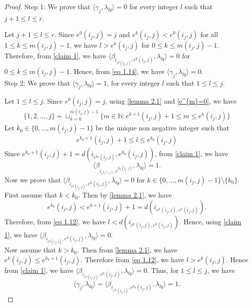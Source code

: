 \documentclass[12pt,reqno]{amsart}
\numberwithin{equation}{section}
\theoremstyle{definition}
\begin{document}
\begin{proof} Step 1: We prove that $\langle\gamma_{j},\lambda_{lq}\rangle=0$ for every integer $l$ such that $j+1\leq l\leq r$.
	
	Let $j+1\leq l\leq r$.
	Since $e^{0}(i_{j},j)=j$ and $e^{k}(i_{j},j)<e^{0}(i_{j},j)$ for all $1\leq k\leq m(i_{j},j)-1$, we have $l>e^{k}(i_{j},j)$ for $0\leq k\leq m(i_{j},j)-1$. Therefore, from \cref{claim 1}, we have  $\langle\beta_{i_{e^{k}(i_{j},j)},e^{k}(i_{j},j)},\lambda_{lq}\rangle=0$ for $0\leq k\leq m(i_{j},j)-1$. Hence, from \cref{eq 1.14}, we have $\langle\gamma_{j},\lambda_{lq}\rangle=0$.\\
	Step 2: We prove that $\langle\gamma_{j},\lambda_{lq}\rangle=1$, for every integer $l$ such that $1\leq l\leq j$.
	
	Let $1\leq l\leq j$. Since $e^{0}(i_{j},j)=j$, using \cref{lemma 2.1} and \cref{e^{m}=0}, we have 
	\begin{align*}
		\{1,2,\ldots,j\}=\sqcup_{k=0}^{m(i_{j},j)-1}\{m\in \mathbb{N}:e^{k+1}(i_{j},j)+1\leq m\leq e^{k}(i_{j},j)\}
	\end{align*}
	Let $k_{0}\in\{0,\ldots,m(i_{j},j)-1\}$ be the unique non negative integer such that \begin{align}\label{eq 1.12}
		e^{k_{0}+1}(i_{j},j)+1\leq l\leq e^{k_{0}}(i_{j},j)
	\end{align}
	Since 	$e^{k_{0}+1}(i_{j},j)+1=d(i_{e^{k_{0}}(i_{j},j)},e^{k_{0}}(i_{j},j))$, from \cref{claim 1}, we have $$\langle\beta_{i_{e^{k_{0}(i_{j},j)}},e^{k_{0}(i_{j},j)}},\lambda_{lq}\rangle=1.$$ Now we prove that $\langle\beta_{i_{e^{k}(i_{j},j)},e^{k}(i_{j},j)},\lambda_{lq}\rangle=0$ for $k\in\{0,\ldots,m(i_{j},j)-1\}\setminus\{k_{0}\}$.
	First assume that $k<k_{0}$. Then by \cref{lemma 2.1}, we have $$e^{k_{0}}(i_{j},j)<e^{k+1}(i_{j},j)+1=d(i_{e^{k}(i_{j},j),e^{k}(i_{j},j)}).$$ Therefore, from \cref{eq 1.12}, we have $l<d(i_{e^{k}(i_{j},j),e^{k}(i_{j},j)})$. Hence, using \cref{claim 1}, we have $\langle\beta_{i_{e^{k}(i_{j},j)},e^{k}(i_{j},j)},\lambda_{lq}\rangle=0$.\\
	Now assume that $k>k_{0}$. Then from \cref{lemma 2.1}, we have $e^{k}(i_{j},j)\leq e^{k_{0}+1}(i_{j},j)$. Therefore from \cref{eq 1.12}, we have $l>e^{k}(i_{j},j)$. Hence from \cref{claim 1}, we have $\langle\beta_{i_{e^{k}(i_{j},j)},e^{k}(i_{j},j)},\lambda_{lq}\rangle=0$. Thus, for $1\leq l\leq j$, we have $$\langle\gamma_{j},\lambda_{lq}\rangle=\langle \beta_{i_{e^{k_{0}}(i_{j},j)},e^{k_{0}}(i_{j},j)},\lambda_{lq}\rangle=1.$$
\end{proof}
\end{document}
